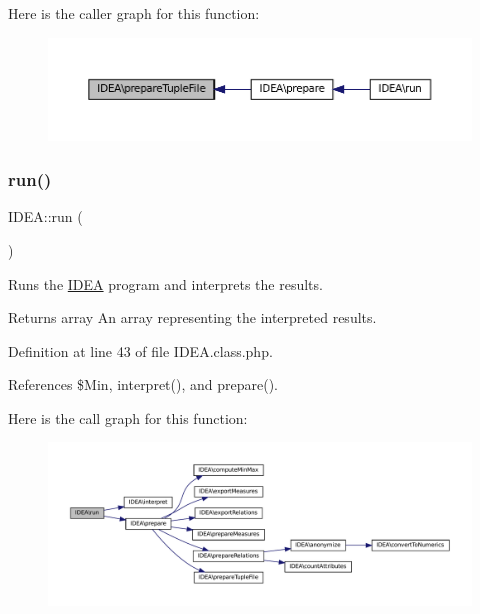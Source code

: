 Here is the caller graph for this function\+:\nopagebreak
\begin{figure}[H]
\begin{center}
\leavevmode
\includegraphics[width=350pt]{class_i_d_e_a_ac163b213929ce738cb4a85a2d867a287_icgraph}
\end{center}
\end{figure}
\mbox{\label{class_i_d_e_a_ab5c7cf60f5cc2ae3bb7d77a36933bb61}} 
\subsubsection{\texorpdfstring{run()}{run()}}
{\footnotesize\ttfamily I\+D\+E\+A\+::run (\begin{DoxyParamCaption}{ }\end{DoxyParamCaption})}

Runs the \hyperlink{class_i_d_e_a}{I\+D\+EA} program and interprets the results.

\begin{DoxyReturn}{Returns}
array An array representing the interpreted results. 
\end{DoxyReturn}


Definition at line 43 of file I\+D\+E\+A.\+class.\+php.



References \$\+Min, interpret(), and prepare().

Here is the call graph for this function\+:\nopagebreak
\begin{figure}[H]
\begin{center}
\leavevmode
\includegraphics[width=350pt]{class_i_d_e_a_ab5c7cf60f5cc2ae3bb7d77a36933bb61_cgraph}
\end{center}
\end{figure}
\mbox{\label{class_i_d_e_a_a0114e10dc4b11caf8767c313b9064cf4}} 
